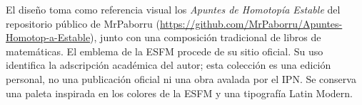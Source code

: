 El diseño toma como referencia visual los \emph{Apuntes de Homotopía Estable} del repositorio público de MrPaborru (\url{https://github.com/MrPaborru/Apuntes-Homotop-a-Estable}), junto con una composición tradicional de libros de matemáticas. El emblema de la ESFM procede de su sitio oficial. Su uso identifica la adscripción académica del autor; esta colección es una edición personal, no una publicación oficial ni una obra avalada por el IPN. Se conserva una paleta inspirada en los colores de la ESFM y una tipografía Latin Modern.
